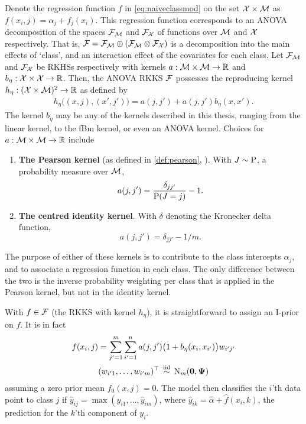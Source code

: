 Denote the regression function $f$ in \cref{eq:naiveclassmod} on the set ${\mathcal X}\times{\mathcal M}$ as $f(x_i,j) = \alpha_j + f_j(x_i)$.
This regression function corresponds to an ANOVA decomposition of the spaces ${\mathcal F}_{\mathcal M}$ and ${\mathcal F}_{\mathcal X}$ of functions over ${\mathcal M}$ and ${\mathcal X}$ respectively. 
That is, ${\mathcal F} = {\mathcal F}_{\mathcal M} \oplus ({\mathcal F}_{\mathcal M} \otimes {\mathcal F}_{\mathcal X})$ is a decomposition into the main effects of `class', and an interaction effect of the covariates for each class.
Let ${\mathcal F}_{\mathcal M}$ and ${\mathcal F}_{\mathcal X}$ be RKHSs respectively with kernels $a:{\mathcal M}\times{\mathcal M}\to\mathbb{R}$ and $b_\eta:{\mathcal X}\times{\mathcal X}\to\mathbb{R}$.
Then, the ANOVA RKKS ${\mathcal F}$ possesses the reproducing kernel $h_\eta:({\mathcal X} \times {\mathcal M})^2 \to \mathbb{R}$ as defined by
\begin{align}\label{eq:anovaclass}
  h_\eta\big( (x,j), (x',j') \big) = a(j,j') + a(j,j')b_\eta(x,x').  
\end{align}
The kernel $b_\eta$ may be any of the kernels described in this thesis, ranging from the linear kernel, to the fBm kernel, or even an ANOVA kernel.
Choices for $a:{\mathcal M} \times {\mathcal M} \to \mathbb{R}$ include  
\begin{enumerate}
  \item \textbf{The Pearson kernel} (as defined in \cref{def:pearson}, ). With $J\sim\operatorname{P}$, a probability measure over ${\mathcal M}$,
  \[
    a(j,j') = \frac{\delta_{jj'}}{\operatorname{P}(J=j)} - 1.
  \]
  \item \textbf{The centred identity kernel}. With $\delta$ denoting the Kronecker delta function,
  \[
    a(j,j') = \delta_{jj'} - 1 / m.
  \]
\end{enumerate}
The purpose of either of these kernels is to contribute to the class intercepts $\alpha_j$, and to associate a regression function in each class.
The only difference between the two is the inverse probability weighting per class that is applied in the Pearson kernel, but not in the identity kernel.

With $f \in {\mathcal F}$ (the RKKS with kernel $h_\eta$), it is straightforward to assign an I-prior on $f$. 
It is in fact
\begin{align}\label{eq:naiveclassiprior}
  \begin{gathered}
    f(x_i,j) = \sum_{j'=1}^m\sum_{i'=1}^n a(j,j')\big(1 + b_\eta(x_i,x_{i'})\big) w_{i'j'} \\
    (w_{i'1},\dots,w_{i'm})^\top \,\overset{\text{iid}}{\sim}\, \operatorname{N}_m({\mathbf 0},{\bm\Psi})
  \end{gathered}
\end{align}
assuming a zero prior mean $f_0(x,j) = 0$.
The model then classifies the $i$'th data point to class $j$ if $\hat y_{ij} = \max(\hat y_{i1},\dots,\hat y_{im})$, where $\hat y_{ik} = \hat\alpha + \hat f(x_i,k)$, the prediction for the $k$'th component of $y_i$.

